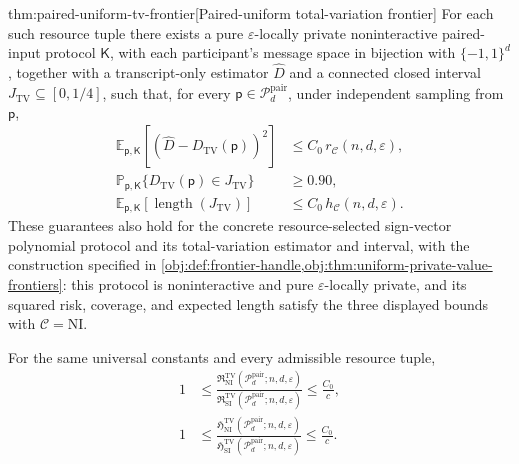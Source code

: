 \documentclass[11pt]{article}
\begin{document}
\begin{theoremv}{thm:paired-uniform-tv-frontier}[Paired-uniform total-variation frontier]
For each such resource tuple there exists a pure \(\varepsilon\)-locally private noninteractive paired-input protocol \(\mathsf K\), with each participant's message space in bijection with \(\{-1,1\}^d\), together with a transcript-only estimator \(\widehat D\) and a connected closed interval \(J_{\mathrm{TV}}\subseteq[0,1/4]\), such that, for every \(\mathsf p\in\mathcal P_d^{\mathrm{pair}}\), under independent sampling from \(\mathsf p\),
\[
\begin{aligned}
 \mathbb E_{\mathsf p,\mathsf K}
   [(\widehat D-D_{\mathrm{TV}}(\mathsf p))^2]
 &\le C_0\,r_{\mathcal C}(n,d,\varepsilon),\\
 \mathbb P_{\mathsf p,\mathsf K}
   \{D_{\mathrm{TV}}(\mathsf p)\in J_{\mathrm{TV}}\}
 &\ge0.90,\\
 \mathbb E_{\mathsf p,\mathsf K}
   [\operatorname{length}(J_{\mathrm{TV}})]
 &\le C_0\,h_{\mathcal C}(n,d,\varepsilon).
\end{aligned}
\]
These guarantees also hold for the concrete resource-selected sign-vector polynomial protocol and its total-variation estimator and interval, with the construction specified in \cref{obj:def:frontier-handle,obj:thm:uniform-private-value-frontiers}: this protocol is noninteractive and pure \(\varepsilon\)-locally private, and its squared risk, coverage, and expected length satisfy the three displayed bounds with \(\mathcal C=\mathrm{NI}\).

For the same universal constants and every admissible resource tuple,
\[
\begin{aligned}
1
&\le
\frac{\mathfrak R^{\mathrm{TV}}_{\mathrm{NI}}
  (\mathcal P_d^{\mathrm{pair}};n,d,\varepsilon)}
 {\mathfrak R^{\mathrm{TV}}_{\mathrm{SI}}
  (\mathcal P_d^{\mathrm{pair}};n,d,\varepsilon)}
\le \frac{C_0}{c},\\
1
&\le
\frac{\mathfrak H^{\mathrm{TV}}_{\mathrm{NI}}
  (\mathcal P_d^{\mathrm{pair}};n,d,\varepsilon)}
 {\mathfrak H^{\mathrm{TV}}_{\mathrm{SI}}
  (\mathcal P_d^{\mathrm{pair}};n,d,\varepsilon)}
\le \frac{C_0}{c}.
\end{aligned}
\]


\end{theoremv}
\end{document}
